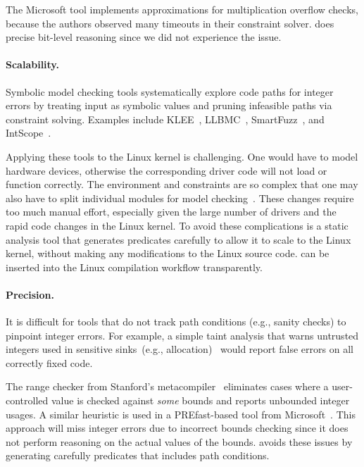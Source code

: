 The Microsoft tool implements approximations for multiplication
overflow checks, because the authors observed many timeouts in their
constraint solver.  \sys does precise bit-level reasoning
since we did not experience the issue.
\fi


\paragraph{Scalability.}
Symbolic model checking tools systematically explore code paths
for integer errors by treating input as symbolic values and pruning
infeasible paths via constraint solving.  Examples include
KLEE~\cite{cadar:klee},
LLBMC~\cite{llbmc},
SmartFuzz~\cite{molnar:catchconv},
and
IntScope~\cite{intscope}.

Applying these tools to the Linux kernel is challenging.  One would
have to model hardware devices, otherwise the corresponding driver
code will not load or function correctly.  The environment and
constraints are so complex that one may also have to split
individual modules for model checking~\cite{engler:vs}.  These
changes require too much manual effort, especially given the
large number of drivers and the rapid code changes in the Linux
kernel.  To avoid these complications \sys is a static analysis tool that
generates predicates carefully to allow it to scale to the Linux kernel, without
making any modifications to the Linux source code. \sys can be inserted into the
Linux compilation workflow transparently.

\paragraph{Precision.}
It is difficult for tools that do not track path conditions (e.g.,
sanity checks) to pinpoint integer errors.  For example, a simple
taint analysis that warns untrusted integers used in sensitive
sinks~(e.g., allocation)~\cite{cqual, lclint} would report false
errors on all correctly fixed code.

The range checker from Stanford's metacompiler~\cite{range-checker}
eliminates cases where a user-controlled value is checked against
\emph{some} bounds and reports unbounded integer usages.  A similar heuristic
is used in a PREfast-based tool from Microsoft~\cite{prefast}.  This
approach will miss integer errors due to incorrect bounds checking since
it does not perform reasoning on the actual values of the bounds. \sys avoids
these issues by generating carefully predicates that includes path conditions.

